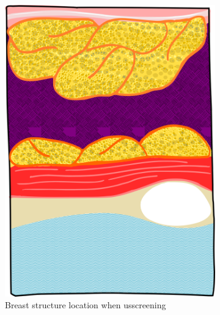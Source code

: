 \begin{figure}
    \hfill
    \begin{subfigure}[b]{0.25\textwidth}  
        \centering 
        \includegraphics[width=\textwidth]{slice}
        \caption[]%
        {{\small Breast structure location when \ac{us}screening}}
        \label{fig:lesions:slice}
    \end{subfigure}
    \hfill
    \begin{subfigure}[b]{0.4\textwidth}   
        \centering 

\end{subfigure}
\end{figure}
